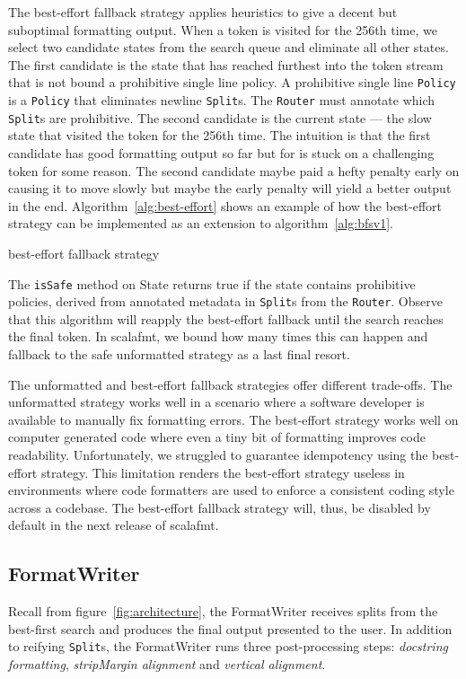 The best-effort fallback strategy applies heuristics to give a decent but suboptimal formatting output.
When a token is visited for the 256th time, we select two candidate states from the search queue and eliminate all other states.
The first candidate is the state that has reached furthest into the token stream that is not bound a prohibitive single line policy.
A prohibitive single line \texttt{Policy} is a \texttt{Policy} that eliminates newline \texttt{Split}s.
The \texttt{Router} must annotate which \texttt{Split}s are prohibitive.
The second candidate is the current state --- the slow state that visited the token for the 256th time.
The intuition is that the first candidate has good formatting output so far but for is stuck on a challenging token for some reason.
The second candidate maybe paid a hefty penalty early on causing it to move slowly but maybe the early penalty will yield a better output in the end.
Algorithm~\ref{alg:best-effort} shows an example of how the best-effort strategy can be implemented as an extension to algorithm~\ref{alg:bfsv1}.
\begin{algorithm}
  \caption{best-effort fallback strategy}\label{alg:best-effort}
  
\end{algorithm}
The \texttt{isSafe} method on State returns true if the state contains prohibitive policies, derived from annotated metadata in \texttt{Split}s from the \texttt{Router}.
Observe that this algorithm will reapply the best-effort fallback until the search reaches the final token.
In scalafmt, we bound how many times this can happen and fallback to the safe unformatted strategy as a last final resort.

The unformatted and best-effort fallback strategies offer different trade-offs.
The unformatted strategy works well in a scenario where a software developer is available to manually fix formatting errors.
The best-effort strategy works well on computer generated code where even a tiny bit of formatting improves code readability.
Unfortunately, we struggled to guarantee idempotency using the best-effort strategy.
This limitation renders the best-effort strategy useless in environments where code formatters are used to enforce a consistent coding style across a codebase.
The best-effort fallback strategy will, thus, be disabled by default in the next release of scalafmt.


\subsection{FormatWriter}
Recall from figure~\ref{fig:architecture}, the FormatWriter receives splits from the best-first search and produces the final output presented to the user.
In addition to reifying \texttt{Split}s, the FormatWriter runs three post-processing steps: \emph{docstring formatting}, \emph{stripMargin alignment} and \emph{vertical alignment}.

